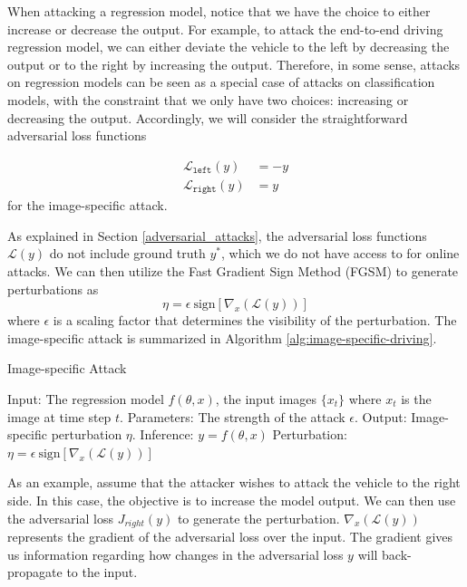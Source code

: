 When attacking a regression model, notice that we have the choice to either increase or decrease the output. For example, to attack the end-to-end driving regression model, we can either deviate the vehicle to the left by decreasing the output or to the right by increasing the output. Therefore, in some sense, attacks on regression models can be seen as a special case of attacks on classification models, with the constraint that we only have two choices: increasing or decreasing the output. Accordingly, we will consider the straightforward adversarial loss functions 

\begin{align}
    \mathcal{L}_{\texttt{left}}(y) &= -y \\
    \mathcal{L}_{\texttt{right}}(y) &= y
\end{align}
for the image-specific attack. 

As explained in Section \ref{adversarial_attacks}, the adversarial loss functions $\mathcal{L}(y)$ do not include ground truth $y^{*}$, which we do not have access to for online attacks. We can then utilize the Fast Gradient Sign Method (FGSM) to generate perturbations as 
\begin{equation}
    \eta = \epsilon \ \text{sign}[\nabla_{x}( \mathcal{L}(y))]
\end{equation}
where $\epsilon$ is a scaling factor that determines the visibility of the perturbation. The image-specific attack is summarized in Algorithm \ref{alg:image-specific-driving}.

\begin{algorithm}[H]
    \caption{Image-specific Attack}\label{alg:image-specific-driving}
    \begin{algorithmic}
        \State Input: The regression model $f(\theta, x)$, the input images $\{x_t\}$ where $x_t$ is the image at time step $t$.
        \State Parameters: The strength of the attack $\epsilon$.
        \State Output: Image-specific perturbation $\eta$.
            \State Inference: $y = f(\theta, x)$
            \State Perturbation: $\eta = \epsilon \ \text{sign}[\nabla_{x}( \mathcal{L}(y))]$
        \EndFor
    \end{algorithmic}
\end{algorithm}

As an example, assume that the attacker wishes to attack the vehicle to the right side. In this case, the objective is to increase the model output. We can then use the adversarial loss $J_{right}(y)$ to generate the perturbation. $\nabla_{x}( \mathcal{L}(y))$ represents the gradient of the adversarial loss over the input. The gradient gives us information regarding how changes in the adversarial loss $y$ will back-propagate to the input.

